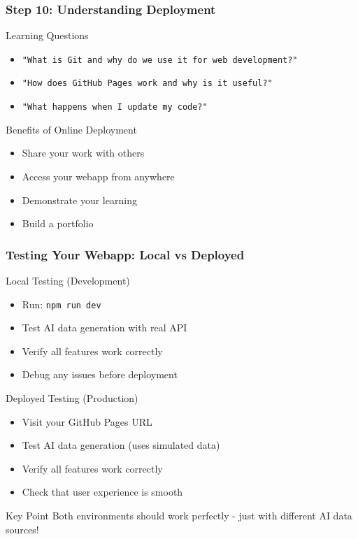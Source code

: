 \documentclass[aspectratio=169]{beamer}
\begin{document}
\begin{frame}
\frametitle{Step 10: Understanding Deployment}
\begin{alertblock}{Learning Questions}
\begin{itemize}
\item \texttt{"What is Git and why do we use it for web development?"}
\item \texttt{"How does GitHub Pages work and why is it useful?"}
\item \texttt{"What happens when I update my code?"}
\end{itemize}
\end{alertblock}

\begin{exampleblock}{Benefits of Online Deployment}
\begin{itemize}
\item Share your work with others
\item Access your webapp from anywhere
\item Demonstrate your learning
\item Build a portfolio
\end{itemize}
\end{exampleblock}
\end{frame}

\begin{frame}
\frametitle{Testing Your Webapp: Local vs Deployed}
\begin{alertblock}{Local Testing (Development)}
\begin{itemize}
\item Run: \texttt{npm run dev}
\item Test AI data generation with real API
\item Verify all features work correctly
\item Debug any issues before deployment
\end{itemize}
\end{alertblock}

\begin{exampleblock}{Deployed Testing (Production)}
\begin{itemize}
\item Visit your GitHub Pages URL
\item Test AI data generation (uses simulated data)
\item Verify all features work correctly
\item Check that user experience is smooth
\end{itemize}
\end{exampleblock}

\begin{alertblock}{Key Point}
Both environments should work perfectly - just with different AI data sources!
\end{alertblock}
\end{frame}
\end{document}

